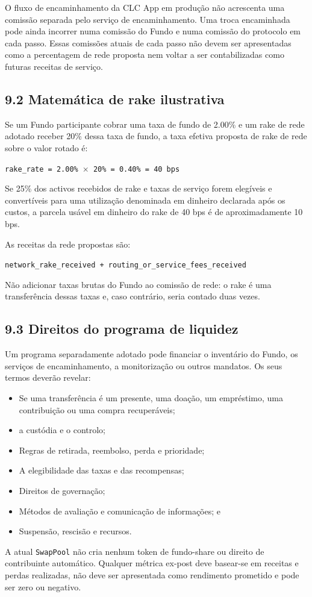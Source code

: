 \documentclass[11pt]{article}
\begin{document}
O fluxo de encaminhamento da CLC App em produção não acrescenta uma comissão separada pelo serviço de encaminhamento. Uma troca encaminhada pode ainda incorrer numa comissão do Fundo e numa comissão do protocolo em cada passo. Essas comissões atuais de cada passo não devem ser apresentadas como a percentagem de rede proposta nem voltar a ser contabilizadas como futuras receitas de serviço.

\subsection*{9.2 Matemática de rake ilustrativa}

Se um Fundo participante cobrar uma taxa de fundo de 2.00\% e um rake de rede adotado receber 20\% dessa taxa de fundo, a taxa efetiva proposta de rake de rede sobre o valor rotado é:

\texttt{rake\_rate = 2.00\% $\times$ 20\% = 0.40\% = 40 bps}

Se 25\% dos activos recebidos de rake e taxas de serviço forem elegíveis e convertíveis para uma utilização denominada em dinheiro declarada após os custos, a parcela usável em dinheiro do rake de 40 bps é de aproximadamente 10 bps.

As receitas da rede propostas são:

\texttt{network\_rake\_received + routing\_or\_service\_fees\_received}

Não adicionar taxas brutas do Fundo ao comissão de rede: o rake é uma transferência dessas taxas e, caso contrário, seria contado duas vezes.

\subsection*{9.3 Direitos do programa de liquidez}

Um programa separadamente adotado pode financiar o inventário do Fundo, os serviços de encaminhamento, a monitorização ou outros mandatos. Os seus termos deverão revelar:

\begin{itemize}[leftmargin=*]
\item Se uma transferência é um presente, uma doação, um empréstimo, uma contribuição ou uma compra recuperáveis;
\item a custódia e o controlo;
\item Regras de retirada, reembolso, perda e prioridade;
\item A elegibilidade das taxas e das recompensas;
\item Direitos de governação;
\item Métodos de avaliação e comunicação de informações; e
\item Suspensão, rescisão e recursos.
\end{itemize}
A atual \texttt{SwapPool} não cria nenhum token de fundo-share ou direito de contribuinte automático. Qualquer métrica ex-post deve basear-se em receitas e perdas realizadas, não deve ser apresentada como rendimento prometido e pode ser zero ou negativo.
\end{document}
